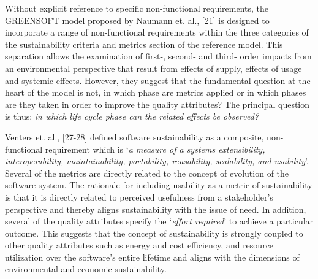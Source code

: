 \documentclass[preprint,12pt,authoryear]{elsarticle}
\begin{document}
Without explicit reference to specific non-functional requirements,
the GREENSOFT model proposed by Naumann et. al., [21] is designed to
incorporate a range of non-functional requirements within the three
categories of the sustainability criteria and metrics section of the
reference model. This separation allows the examination of first-,
second- and third- order impacts from an environmental perspective
that result from effects of supply, effects of usage and systemic
effects. However, they suggest that the fundamental question at the
heart of the model is not, in which phase are metrics applied or in
which phases are they taken in order to improve the quality
attributes? The principal question is thus: {\emph{in which life cycle
phase can the related effects be observed?}}

Venters et. al., [27-28] defined software sustainability as a
composite, non-functional requirement which is `{\emph{a measure of a
systems extensibility, interoperability, maintainability, portability,
reusability, scalability, and usability}}'. Several of the metrics are
directly related to the concept of evolution of the software
system. The rationale for including usability as a metric of
sustainability is that it is directly related to perceived usefulness
from a stakeholder’s perspective and thereby aligns sustainability
with the issue of need. In addition, several of the quality attributes
specify the `{\emph{effort required}}' to achieve a particular
outcome. This suggests that the concept of sustainability is strongly
coupled to other quality attributes such as energy and cost
efficiency, and resource utilization over the software’s entire
lifetime and aligns with the dimensions of environmental and economic
sustainability.
\end{document}
